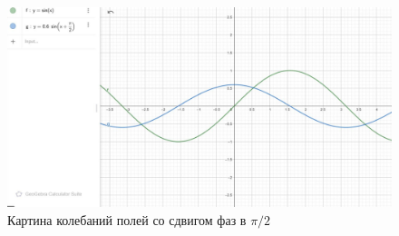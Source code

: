 \begin{figure}[H]
	\centering
	\includegraphics[width=15cm]{3.jpg}
	\caption{Картина колебаний полей со сдвигом фаз в $\pi/2$}
\end{figure}
